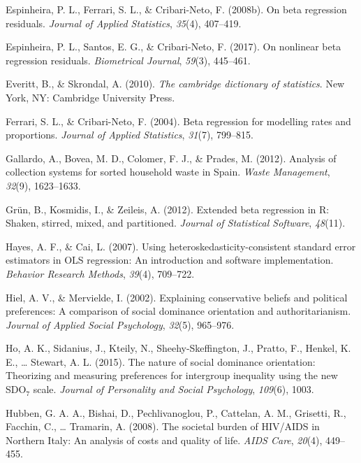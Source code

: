 \documentclass[english,man]{apa6}
\newcounter{author}
\theoremstyle{definition}
\theoremstyle{definition}
\theoremstyle{remark}
\begin{document}
\hypertarget{ref-espinheira2008beta}{}
Espinheira, P. L., Ferrari, S. L., \& Cribari-Neto, F. (2008b). On beta
regression residuals. \emph{Journal of Applied Statistics},
\emph{35}(4), 407--419.

\hypertarget{ref-espinheira2017nonlinear}{}
Espinheira, P. L., Santos, E. G., \& Cribari-Neto, F. (2017). On
nonlinear beta regression residuals. \emph{Biometrical Journal},
\emph{59}(3), 445--461.

\hypertarget{ref-everitt2002cambridge}{}
Everitt, B., \& Skrondal, A. (2010). \emph{The cambridge dictionary of
statistics}. New York, NY: Cambridge University Press.

\hypertarget{ref-ferrari2004beta}{}
Ferrari, S. L., \& Cribari-Neto, F. (2004). Beta regression for
modelling rates and proportions. \emph{Journal of Applied Statistics},
\emph{31}(7), 799--815.

\hypertarget{ref-gallardo2012analysis}{}
Gallardo, A., Bovea, M. D., Colomer, F. J., \& Prades, M. (2012).
Analysis of collection systems for sorted household waste in Spain.
\emph{Waste Management}, \emph{32}(9), 1623--1633.

\hypertarget{ref-grun2012extended}{}
Grün, B., Kosmidis, I., \& Zeileis, A. (2012). Extended beta regression
in R: Shaken, stirred, mixed, and partitioned. \emph{Journal of
Statistical Software}, \emph{48}(11).

\hypertarget{ref-hayes2007using}{}
Hayes, A. F., \& Cai, L. (2007). Using heteroskedasticity-consistent
standard error estimators in OLS regression: An introduction and
software implementation. \emph{Behavior Research Methods}, \emph{39}(4),
709--722.

\hypertarget{ref-hiel2002explaining}{}
Hiel, A. V., \& Mervielde, I. (2002). Explaining conservative beliefs
and political preferences: A comparison of social dominance orientation
and authoritarianism. \emph{Journal of Applied Social Psychology},
\emph{32}(5), 965--976.

\hypertarget{ref-ho2015nature}{}
Ho, A. K., Sidanius, J., Kteily, N., Sheehy-Skeffington, J., Pratto, F.,
Henkel, K. E., \ldots{} Stewart, A. L. (2015). The nature of social
dominance orientation: Theorizing and measuring preferences for
intergroup inequality using the new SDO\(_7\) scale. \emph{Journal of
Personality and Social Psychology}, \emph{109}(6), 1003.

\hypertarget{ref-hubben2008societal}{}
Hubben, G. A. A., Bishai, D., Pechlivanoglou, P., Cattelan, A. M.,
Grisetti, R., Facchin, C., \ldots{} Tramarin, A. (2008). The societal
burden of HIV/AIDS in Northern Italy: An analysis of costs and quality
of life. \emph{AIDS Care}, \emph{20}(4), 449--455.
\end{document}
